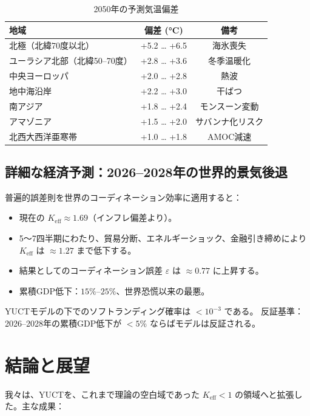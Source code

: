 \documentclass[12pt,a4paper]{article}
\newcommand{\Keff}{K_{\mathrm{eff}}}
\begin{document}
	\begin{table}[H]
		\centering
		\caption{2050年の予測気温偏差}
		\begin{tabular}{lcc}
			\toprule
			地域 & 偏差 (°C) & 備考 \\
			\midrule
			北極（北緯70度以北） & +5.2 … +6.5 & 海氷喪失 \\
			ユーラシア北部（北緯50–70度） & +2.8 … +3.6 & 冬季温暖化 \\
			中央ヨーロッパ & +2.0 … +2.8 & 熱波 \\
			地中海沿岸 & +2.2 … +3.0 & 干ばつ \\
			南アジア & +1.8 … +2.4 & モンスーン変動 \\
			アマゾニア & +1.5 … +2.0 & サバンナ化リスク \\
			北西大西洋亜寒帯 & +1.0 … +1.8 & AMOC減速 \\
			\bottomrule
		\end{tabular}
	\end{table}
	
	\subsection{詳細な経済予測：2026–2028年の世界的景気後退}
	
	普遍的誤差則を世界のコーディネーション効率に適用すると：
	\begin{itemize}
		\item 現在の \(\Keff \approx 1.69\)（インフレ偏差より）。
		\item 5～7四半期にわたり、貿易分断、エネルギーショック、金融引き締めにより \(\Keff\) は \(\approx 1.27\) まで低下する。
		\item 結果としてのコーディネーション誤差 \(\varepsilon\) は \(\approx 0.77\) に上昇する。
		\item 累積GDP低下：\(15\%\)–\(25\%\)、世界恐慌以来の最悪。
	\end{itemize}
	YUCTモデルの下でのソフトランディング確率は \(<10^{-3}\) である。
	反証基準：2026–2028年の累積GDP低下が \(<5\%\) ならばモデルは反証される。
	
	\section{結論と展望}
	
	我々は、YUCTを、これまで理論の空白域であった \(\Keff < 1\) の領域へと拡張した。主な成果：
	
\end{document}
